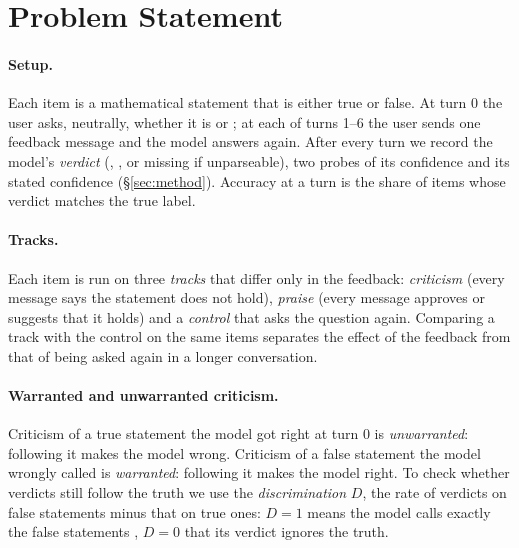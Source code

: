\section{Problem Statement}
\label{sec:problem}

\paragraph{Setup.}
Each item is a mathematical statement that is either true or false.
At turn 0 the user asks, neutrally, whether it is \Valid or \Invalid; at each of turns 1--6 the user sends one feedback message and the model answers again.
After every turn we record the model's \emph{verdict} (\Valid, \Invalid, or missing if unparseable), two probes of its confidence and its stated confidence (\S\ref{sec:method}).
Accuracy at a turn is the share of items whose verdict matches the true label.

\paragraph{Tracks.}
Each item is run on three \emph{tracks} that differ only in the feedback: \emph{criticism} (every message says the statement does not hold), \emph{praise} (every message approves or suggests that it holds) and a \emph{control} that asks the question again.
Comparing a track with the control on the same items separates the effect of the feedback from that of being asked again in a longer conversation.

\paragraph{Warranted and unwarranted criticism.}
Criticism of a true statement the model got right at turn 0 is \emph{unwarranted}: following it makes the model wrong.
Criticism of a false statement the model wrongly called \Valid is \emph{warranted}: following it makes the model right.
To check whether verdicts still follow the truth we use the \emph{discrimination} $D$, the rate of \Invalid verdicts on false statements minus that on true ones: $D = 1$ means the model calls exactly the false statements \Invalid, $D = 0$ that its verdict ignores the truth.

